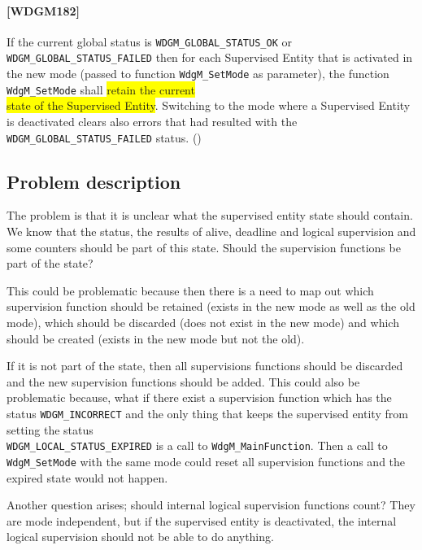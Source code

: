 \paragraph{[WDGM182]} If the current global status is
\lstinline!WDGM_GLOBAL_STATUS_OK! or
\lstinline!WDGM_GLOBAL_STATUS_FAILED! then for each Supervised Entity
that is activated in the new mode (passed to function
\lstinline!WdgM_SetMode! as parameter), the function
\lstinline!WdgM_SetMode! shall \colorbox{yellow}{retain the current\\
state of the Supervised Entity}.  Switching to the mode where a
Supervised Entity is deactivated clears also errors that had resulted
with the \lstinline!WDGM_GLOBAL_STATUS_FAILED!  status. ()

\subsection{Problem description}
The problem is that it is unclear what the supervised entity state
should contain. We know that the status, the results of alive,
deadline and logical supervision and some counters should be part of
this state. Should the supervision functions be part of the state?

This could be problematic because then there is a need to map out
which supervision function should be retained (exists in the new mode
as well as the old mode), which should be discarded (does not exist in
the new mode) and which should be created (exists in the new mode but
not the old).

If it is not part of the state, then all supervisions functions should
be discarded and the new supervision functions should be added.  This
could also be problematic because, what if there exist a supervision
function which has the status \lstinline!WDGM_INCORRECT!  and the only
thing that keeps the supervised entity from setting the status\\
\lstinline!WDGM_LOCAL_STATUS_EXPIRED! is a call to
\lstinline!WdgM_MainFunction!. Then a call to \lstinline!WdgM_SetMode!
with the same mode could reset all supervision functions and the
expired state would not happen.

Another question arises; should internal logical supervision functions
count? They are mode independent, but if the supervised entity is
deactivated, the internal logical supervision should not be able to do
anything.

